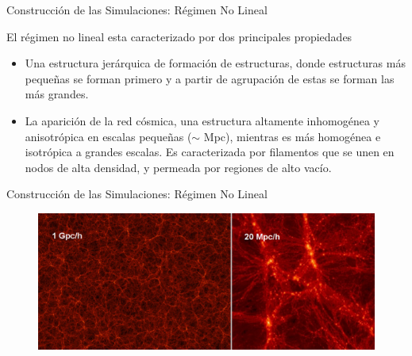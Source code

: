 \documentclass[8pt,fleqn]{beamer}
\begin{document}
\begin{frame}
\begin{block}{Construcción de las Simulaciones: Régimen No Lineal}\justifying

El régimen no lineal esta caracterizado por dos principales propiedades

\begin{itemize}
\item Una estructura jerárquica de formación de estructuras, donde estructuras
más pequeñas se forman primero y a partir de agrupación de estas se forman
las más grandes.
\item La aparición de la red cósmica, una estructura altamente inhomogénea
y anisotrópica en escalas pequeñas ($\sim$ Mpc), mientras es más homogénea
e isotrópica a grandes escalas. Es caracterizada por filamentos que se unen
en nodos de alta densidad, y permeada por regiones de alto vacío.
\end{itemize}

\end{block}
\end{frame}
\begin{frame}
\begin{block}{Construcción de las Simulaciones: Régimen No Lineal}\justifying
\begin{figure}[htbp]
	\centering
	\includegraphics[trim = 0mm 0mm 0mm 0mm, clip, width=1.0\textwidth]
	{./figures/Web.png}
\end{figure}
\end{block}
\end{frame}
\end{document}
